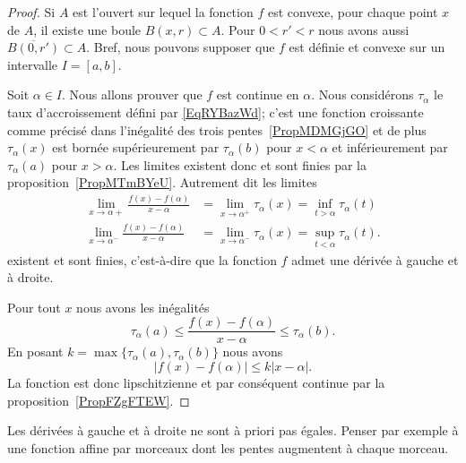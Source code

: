 \begin{proof}
	Si \( A\) est l'ouvert sur lequel la fonction \( f\) est convexe, pour chaque point \( x\) de \( A\), il existe une boule \( B(x,r)\subset A\). Pour \( 0<r'<r\) nous avons aussi \( \overline{B(0,r')}\subset A\). Bref, nous pouvons supposer que \( f\) est définie et convexe sur un intervalle \( I=[a ,b]\).

	Soit \( \alpha\in I\). Nous allons prouver que \( f\) est continue en \( \alpha\). Nous considérons \( \tau_{\alpha}\) le taux d'accroissement défini par \eqref{EqRYBazWd}; c'est une fonction croissante comme précisé dans l'inégalité des trois pentes~\ref{PropMDMGjGO} et de plus \( \tau_{\alpha}(x)\) est bornée supérieurement par \( \tau_{\alpha}(b)\) pour \( x<\alpha\) et inférieurement par \( \tau_{\alpha}(a)\) pour \( x>\alpha\). Les limites existent donc et sont finies par la proposition~\ref{PropMTmBYeU}. Autrement dit les limites
	\begin{subequations}
		\begin{align}
			\lim_{x\to \alpha+} \frac{ f(x)-f(\alpha) }{ x-\alpha }  & =\lim_{x\to \alpha^+} \tau_{\alpha}(x)=\inf_{t>\alpha}\tau_{\alpha}(t)  \\
			\lim_{x\to \alpha^-} \frac{ f(x)-f(\alpha) }{ x-\alpha } & =\lim_{x\to \alpha^-} \tau_{\alpha}(x)=\sup_{t<\alpha}\tau_{\alpha}(t).
		\end{align}
	\end{subequations}
	existent et sont finies, c'est-à-dire que la fonction \( f\) admet une dérivée à gauche et à droite.

	Pour tout \( x\) nous avons les inégalités
	\begin{equation}
		\tau_{\alpha}(a)\leq \frac{ f(x)-f(\alpha) }{ x-\alpha }\leq \tau_{\alpha}(b).
	\end{equation}
	En posant \( k=\max\{ \tau_{\alpha}(a),\tau_{\alpha}(b) \}\) nous avons
	\begin{equation}
		\big| f(x)-f(\alpha) \big|\leq k| x-\alpha |.
	\end{equation}
	La fonction est donc lipschitzienne et par conséquent continue par la proposition~\ref{PropFZgFTEW}.
\end{proof}

\begin{remark}
	Les dérivées à gauche et à droite ne sont à priori pas égales. Penser par exemple à une fonction affine par morceaux dont les pentes augmentent à chaque morceau.
\end{remark}

